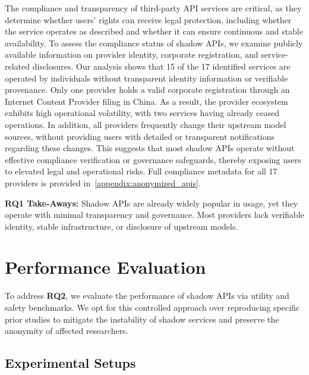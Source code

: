 \documentclass[letterpaper,twocolumn,10pt]{article}
\begin{document}
The compliance and transparency of third-party API services are critical, as they determine whether users’ rights can receive legal protection, including whether the service operates as described and whether it can ensure continuous and stable availability.
To assess the compliance status of shadow APIs, we examine publicly available information on provider identity, corporate registration, and service-related disclosures.
Our analysis shows that 15 of the 17 identified services are operated by individuals without transparent identity information or verifiable provenance.  
Only one provider holds a valid corporate registration through an Internet Content Provider filing in China.  
As a result, the provider ecosystem exhibits high operational volatility, with two services having already ceased operations.  
In addition, all providers frequently change their upstream model sources, without providing users with detailed or transparent notifications regarding these changes.
This suggests that most shadow APIs operate without effective compliance verification or governance safeguards, thereby exposing users to elevated legal and operational risks.
Full compliance metadata for all 17 providers is provided in~\cref{appendix:anonymized_apis}.

\begin{tcolorbox}[colback=gray!25!white, size=title,breakable,boxsep=1mm,colframe=white,before={\vskip1mm}, after={\vskip0mm}]
\textbf{RQ1 Take-Aways:}
Shadow APIs are already widely popular in usage, yet they operate with minimal transparency and governance. 
Most providers lack verifiable identity, stable infrastructure, or disclosure of upstream models.
\end{tcolorbox}

\section{Performance Evaluation}
\label{section:utility}
To address \textbf{RQ2}, we evaluate the performance of shadow APIs via utility and safety benchmarks. 
We opt for this controlled approach over reproducing specific prior studies to mitigate the instability of shadow services and preserve the anonymity of affected researchers.

\subsection{Experimental Setups}
\end{document}
